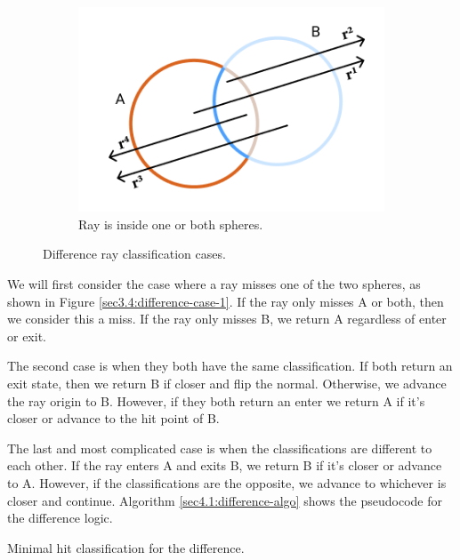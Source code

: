 \documentclass[a4paper,11pt,oneside]{article}
\begin{document}
\begin{figure}[ht]
	\hfill
	\begin{subfigure}[b]{0.3\textwidth}
		\centering
		\includegraphics[width=\textwidth]{section4/4.1/difference-case-3.png}
		\caption{Ray is inside one or both spheres.}
		\label{sec3.4:difference-case-3}
	\end{subfigure}
	\caption{Difference ray classification cases.}
	\label{sec3.4:sphere-difference}
\end{figure}


We will first consider the case where a ray misses one of the two spheres, as shown in Figure \ref{sec3.4:difference-case-1}. If the ray only misses A or both, then we consider this a miss. If the ray only misses B, we return A regardless of enter or exit.

The second case is when they both have the same classification. If both return an exit state, then we return B if closer and flip the normal. Otherwise, we advance the ray origin to B. However, if they both return an enter we return A if it's closer or advance to the hit point of B.

The last and most complicated case is when the classifications are different to each other. If the ray enters A and exits B, we return B if it's closer or advance to A. However, if the classifications are the opposite, we advance to whichever is closer and continue. Algorithm \ref{sec4.1:difference-algo} shows the pseudocode for the difference logic.

\begin{algorithm}[H]
	\SetAlgoLined
	\caption{Minimal hit classification for the difference.}
	\label{sec3.4:difference_algo}
\end{algorithm} 
\end{document}
